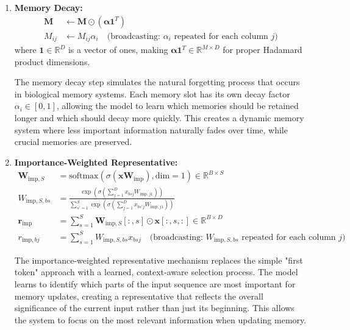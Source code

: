 \documentclass{article}
\begin{document}
\begin{enumerate}
\item \textbf{Memory Decay:}
\begin{align}
\mathbf{M} &\leftarrow \mathbf{M} \odot (\boldsymbol{\alpha} \mathbf{1}^T) \\
M_{ij} &\leftarrow M_{ij} \alpha_i \quad \text{(broadcasting: $\alpha_i$ repeated for each column $j$)}
\end{align}
where $\mathbf{1} \in \mathbb{R}^{D}$ is a vector of ones, making $\boldsymbol{\alpha} \mathbf{1}^T \in \mathbb{R}^{M \times D}$ for proper Hadamard product dimensions.

The memory decay step simulates the natural forgetting process that occurs in biological memory systems. Each memory slot has its own decay factor $\alpha_i \in [0,1]$, allowing the model to learn which memories should be retained longer and which should decay more quickly. This creates a dynamic memory system where less important information naturally fades over time, while crucial memories are preserved.

\item \textbf{Importance-Weighted Representative:}
\begin{align}
\mathbf{W}_{\text{imp},S} &= \text{softmax}(\sigma(\mathbf{x} \mathbf{W}_{\text{imp}}), \text{dim}=1) \in \mathbb{R}^{B \times S} \\
W_{\text{imp},S,bs} &= \frac{\exp(\sigma(\sum_{j=1}^{D} x_{bsj} W_{\text{imp},j1}))}{\sum_{s'=1}^{S} \exp(\sigma(\sum_{j=1}^{D} x_{bs'j} W_{\text{imp},j1}))} \\
\mathbf{r}_{\text{imp}} &= \sum_{s=1}^{S} \mathbf{W}_{\text{imp},S}[:, s] \odot \mathbf{x}[:, s, :] \in \mathbb{R}^{B \times D} \\
r_{\text{imp},bj} &= \sum_{s=1}^{S} W_{\text{imp},S,bs} x_{bsj} \quad \text{(broadcasting: $W_{\text{imp},S,bs}$ repeated for each column $j$)}
\end{align}

The importance-weighted representative mechanism replaces the simple "first token" approach with a learned, context-aware selection process. The model learns to identify which parts of the input sequence are most important for memory updates, creating a representative that reflects the overall significance of the current input rather than just its beginning. This allows the system to focus on the most relevant information when updating memory.


\end{enumerate}
\end{document}
